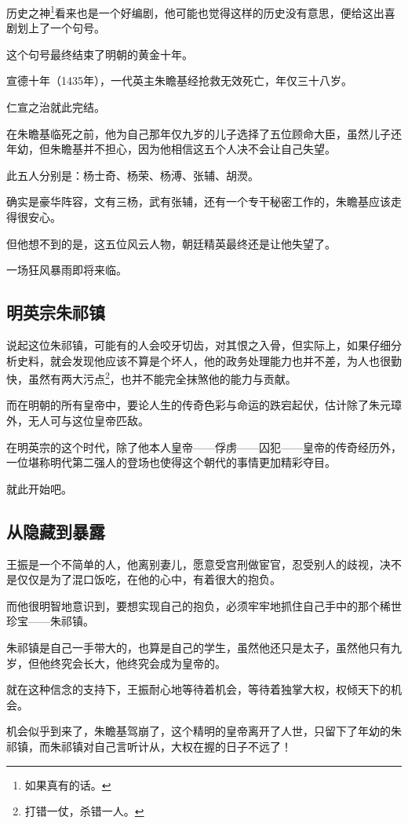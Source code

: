 \begin{multicols}{\theparacolNo}
历史之神\footnote{如果真有的话。}看来也是一个好编剧，他可能也觉得这样的历史没有意思，便给这出喜剧划上了一个句号。

这个句号最终结束了明朝的黄金十年。

宣德十年（1435年），一代英主朱瞻基经抢救无效死亡，年仅三十八岁。

仁宣之治就此完结。

在朱瞻基临死之前，他为自己那年仅九岁的儿子选择了五位顾命大臣，虽然儿子还年幼，但朱瞻基并不担心，因为他相信这五个人决不会让自己失望。

此五人分别是：杨士奇、杨荣、杨溥、张辅、胡濙。

确实是豪华阵容，文有三杨，武有张辅，还有一个专干秘密工作的，朱瞻基应该走得很安心。

但他想不到的是，这五位风云人物，朝廷精英最终还是让他失望了。

一场狂风暴雨即将来临。

\subsection{明英宗朱祁镇}
说起这位朱祁镇，可能有的人会咬牙切齿，对其恨之入骨，但实际上，如果仔细分析史料，就会发现他应该不算是个坏人，他的政务处理能力也并不差，为人也很勤快，虽然有两大污点\footnote{打错一仗，杀错一人。}，也并不能完全抹煞他的能力与贡献。

而在明朝的所有皇帝中，要论人生的传奇色彩与命运的跌宕起伏，估计除了朱元璋外，无人可与这位皇帝匹敌。

在明英宗的这个时代，除了他本人皇帝——俘虏——囚犯——皇帝的传奇经历外，一位堪称明代第二强人的登场也使得这个朝代的事情更加精彩夺目。

就此开始吧。

\subsection{从隐藏到暴露}
王振是一个不简单的人，他离别妻儿，愿意受宫刑做宦官，忍受别人的歧视，决不是仅仅是为了混口饭吃，在他的心中，有着很大的抱负。

而他很明智地意识到，要想实现自己的抱负，必须牢牢地抓住自己手中的那个稀世珍宝——朱祁镇。

朱祁镇是自己一手带大的，也算是自己的学生，虽然他还只是太子，虽然他只有九岁，但他终究会长大，他终究会成为皇帝的。

就在这种信念的支持下，王振耐心地等待着机会，等待着独掌大权，权倾天下的机会。

机会似乎到来了，朱瞻基驾崩了，这个精明的皇帝离开了人世，只留下了年幼的朱祁镇，而朱祁镇对自己言听计从，大权在握的日子不远了！


\end{multicols}
